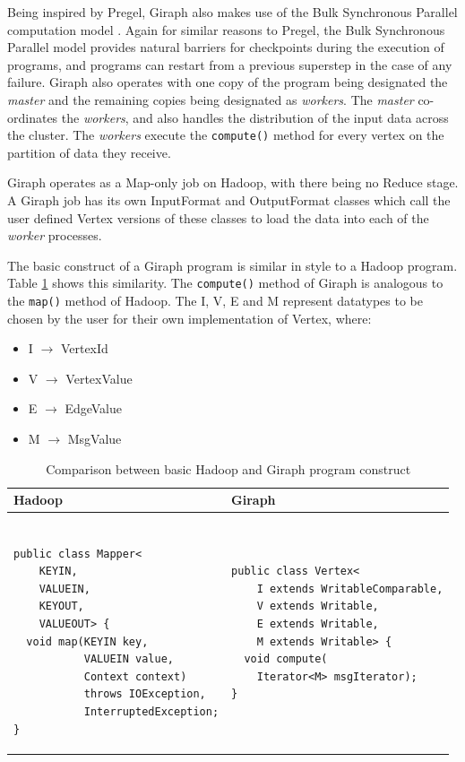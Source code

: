 Being inspired by Pregel, Giraph also makes use of the Bulk Synchronous Parallel computation model \cite{bsp}. Again for similar reasons to Pregel, the Bulk Synchronous Parallel model provides natural barriers for checkpoints during the execution of programs, and programs can restart from a previous superstep in the case of any failure. Giraph also operates with one copy of the program being designated the \emph{master} and the remaining copies being designated as \emph{workers}. The \emph{master} co-ordinates the \emph{workers}, and also handles the distribution of the input data across the cluster. The \emph{workers} execute the \verb/compute()/ method for every vertex on the partition of data they receive.

Giraph operates as a Map-only job on Hadoop, with there being no Reduce stage. A Giraph job has its own InputFormat and OutputFormat classes which call the user defined Vertex versions of these classes to load the data into each of the \emph{worker} processes.

The basic construct of a Giraph program is similar in style to a Hadoop program. Table \ref{tab:hadoopgiraph} shows this similarity. The \verb/compute()/ method of Giraph is analogous to the \verb/map()/ method of Hadoop. The I, V, E and M represent datatypes to be chosen by the user for their own implementation of Vertex, where:

\begin{itemize}
	\item I $\rightarrow$ VertexId
	\item V $\rightarrow$ VertexValue
	\item E $\rightarrow$ EdgeValue
	\item M $\rightarrow$ MsgValue
\end{itemize}

\begin{table}%
\centering
\begin{tabular}{|m{7.25cm}|m{7.25cm}|} \hline
Hadoop & Giraph \\ \hline
\begin{verbatim}

public class Mapper<
    KEYIN,
    VALUEIN,
    KEYOUT,
    VALUEOUT> {
  void map(KEYIN key,
           VALUEIN value,
           Context context)
           throws IOException,
           InterruptedException;
}
\end{verbatim} &
\begin{verbatim}
public class Vertex<
    I extends WritableComparable,
    V extends Writable,
    E extends Writable,
    M extends Writable> {
  void compute(
    Iterator<M> msgIterator);
}
\end{verbatim} \\
\hline
\end{tabular}
\caption{Comparison between basic Hadoop and Giraph program construct \cite{giraphtalk}}
\label{tab:hadoopgiraph}
\end{table}